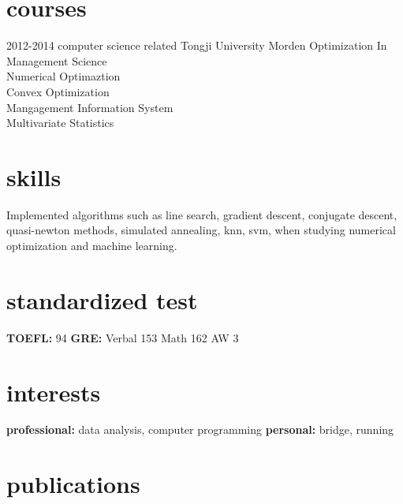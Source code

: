 \documentclass[]{friggeri-cv} %
\begin{document}
\section{courses}
\begin{entrylist}
\entry
{2012-2014}
{computer science related}
{Tongji University}
{Morden Optimization In Management Science\\
Numerical Optimaztion\\
Convex Optimization\\
Mangagement Information System\\
Multivariate Statistics}
\end{entrylist}





\section{skills}
{Implemented algorithms such as line search, gradient descent, conjugate descent, quasi-newton methods, simulated annealing, knn, svm, when studying numerical optimization and machine learning.}

\section{standardized test}
\textbf{TOEFL:} 94  \textbf{GRE:} Verbal 153 Math 162 AW 3



\section{interests}

\textbf{professional:} data analysis, computer programming  \textbf{personal:} bridge, running


\section{publications}
\end{document}
